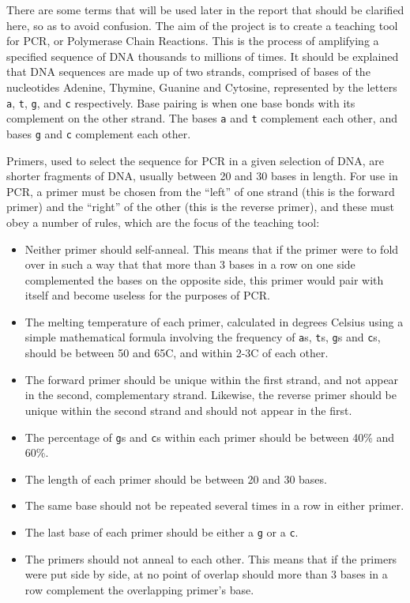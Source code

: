 
There are some terms that will be used later in the report that should
be clarified here, so as to avoid confusion.
The aim of the project is to create a teaching tool for PCR, or
Polymerase Chain Reactions.
This is the process of amplifying a specified sequence of DNA thousands to
millions of times.
It should be explained that DNA sequences are made up of two strands,
comprised of bases of the nucleotides Adenine, Thymine, Guanine and
Cytosine, represented by the letters \verb£a£, \verb£t£, \verb£g£, and
\verb£c£ respectively.
Base pairing is when one base bonds with its complement on the other
strand.
The bases \verb£a£ and \verb£t£ complement each other, and bases
\verb£g£ and \verb£c£ complement each other.

Primers, used to select the sequence for PCR in a given selection of
DNA, are shorter fragments of DNA, usually between 20 and 30 bases in
length.
For use in PCR, a primer must be chosen from the ``left'' of one
strand (this is the forward primer) and the ``right'' of the other
(this is the reverse primer), and these must obey a number of rules,
which are the focus of the teaching tool:
\begin{itemize}
\item Neither primer should self-anneal. 
  This means that if the primer were to fold over
  in such a way that that more than 3 bases in a row on one side
  complemented the bases on the opposite side, this primer would pair 
  with itself and become useless for the purposes of PCR.
\item The melting temperature of each primer, calculated in degrees
  Celsius using a simple mathematical formula involving the frequency
  of \verb£a£s, \verb£t£s, \verb£g£s and \verb£c£s, should be between
  50 and 65\degree C, and within 2-3\degree C of each other.
\item The forward primer should be unique within the first strand, and
  not appear in the second, complementary strand. Likewise, the
  reverse primer should be unique within the second strand and should
  not appear in the first.
\item The percentage of \verb£g£s and \verb£c£s within each primer
  should be between 40\% and 60\%.
\item The length of each primer should be between 20 and 30 bases.
\item The same base should not be repeated several times in a row in
  either primer.
\item The last base of each primer should be either a \verb£g£ or a
  \verb£c£.
\item The primers should not anneal to each other. 
  This means that if the primers were put side by side, at no point of
  overlap should more than 3 bases in a row complement the overlapping
  primer’s base.
\end{itemize}

